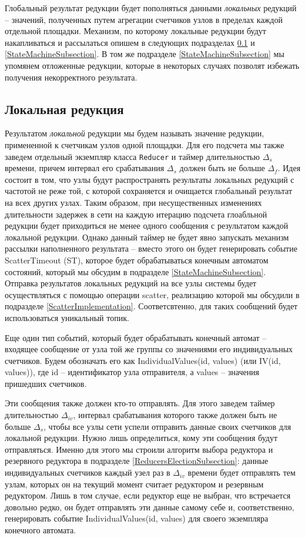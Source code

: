 \documentclass{article}
\theoremstyle{plain}
\theoremstyle{plain}
\theoremstyle{plain}
\theoremstyle{plain}
\theoremstyle{definition}
\theoremstyle{remark}
\theoremstyle{plain}
\begin{document}
Глобальный результат редукции будет пополняться данными \textit{локальных} редукций -- значений, полученных путем агрегации счетчиков узлов в пределах каждой отдельной площадки. Механизм, по которому локальные редукции будут накапливаться и рассылаться опишем в следующих подразделах \ref{LocalReductionsSubection} и \ref{StateMachineSubsection}. В том же подразделе \ref{StateMachineSubsection} мы упомянем отложенные редукции, которые в некоторых случаях позволят избежать получения некорректного результата.

\subsection{Локальная редукция}
\label{LocalReductionsSubection}

Результатом \textit{локальной} редукции мы будем называть значение редукции, примененной к счетчикам узлов одной площадки. Для его подсчета мы также заведем отдельный экземпляр класса \texttt{Reducer} и таймер длительностью $\Delta_s$ времени, причем интервал его срабатывания $\Delta_s$ должен быть не больше $\Delta_f$. Идея состоит в том, что узлы будут распространять результаты локальных редукций с частотой не реже той, с которой сохраняется и очищается глобальный результат на всех других узлах. Таким образом, при несущественных изменениях длительности задержек в сети на каждую итерацию подсчета глоабльной редукции будет приходиться не менее одного сообщения с результатом каждой локальной редукции. Однако данный таймер не будет явно запускать механизм рассылки наполненного результата -- вместо этого он будет генерировать событие ScatterTimeout (ST), которое будет обрабатываться конечным автоматом состояний, который мы обсудим в подразделе \ref{StateMachineSubsection}. Отправка результатов локальных редукций на все узлы системы будет осуществляться с помощью операции scatter, реализацию которой мы обсудили в подразделе \ref{ScatterImplementation}. Соответсвтенно, для таких сообщений будет использоваться уникальный топик.

Еще один тип событий, который будет обрабатывать конечный автомат -- входящее сообщение от узла той же группы со значениями его индивидуальных счетчиков. Будем обозначать его как IndividualValues(id, values) (или IV(id, values)), где id -- идентификатор узла отправителя, а values -- значения пришедших счетчиков.

Эти сообщения также должен кто-то отправлять. Для этого заведем таймер длительностью $\Delta_{iv}$, интервал срабатывания которого также должен быть не больше $\Delta_s$, чтобы все узлы сети успели отправить данные своих счетчиков для локальной редукции. Нужно лишь определиться, кому эти сообщения будут отправляться. Именно для этого мы строили алгоритм выбора редуктора и резервного редуктора в подразделе \ref{ReducersElectionSubsection}: данные индивидуальных счетчиков каждый узел раз в $\Delta_{iv}$ времени будет отправлять тем узлам, которых он на текущий момент считает редуктором и резервным редуктором. Лишь в том случае, если редуктор еще не выбран, что встречается довольно редко, он будет отправлять эти данные самому себе и, соответственно, генерировать событие IndividualValues(id, values) для своего экземпляра конечного автомата.
\end{document}
